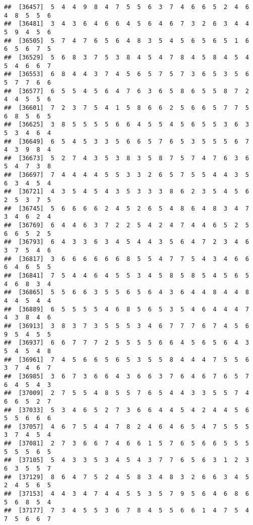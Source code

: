 \documentclass[
]{book}
\begin{document}
\begin{verbatim}
##  [36457]  5  4  4  9  8  4  7  5  5  6  3  7  4  6  6  5  2  4  6  4  8  5  5  6
##  [36481]  3  4  3  6  4  6  6  4  5  6  4  6  7  3  2  6  3  4  4  5  9  4  5  6
##  [36505]  5  7  4  7  6  5  6  4  8  3  5  4  5  6  5  6  5  1  6  6  5  6  7  5
##  [36529]  5  6  8  3  7  5  3  8  4  5  4  7  8  4  5  8  4  5  4  5  4  6  6  7
##  [36553]  6  8  4  4  3  7  4  5  6  5  7  5  7  3  6  5  3  5  6  5  7  7  6  6
##  [36577]  6  5  5  4  5  6  4  7  6  3  6  5  8  6  5  5  8  7  2  4  4  5  5  6
##  [36601]  7  2  3  7  5  4  1  5  8  6  6  2  5  6  6  5  7  7  5  6  8  5  6  5
##  [36625]  3  8  5  5  5  5  6  6  4  5  5  4  5  6  5  5  3  6  3  5  3  4  6  4
##  [36649]  6  5  4  5  3  3  5  6  6  5  7  6  5  3  5  5  5  6  7  4  3  9  8  4
##  [36673]  5  2  7  4  3  5  3  8  3  5  8  7  5  7  4  7  6  3  6  5  4  7  3  8
##  [36697]  7  4  4  4  4  5  5  3  3  2  6  5  7  5  5  4  4  3  5  6  3  4  5  4
##  [36721]  4  3  5  4  5  4  3  5  3  3  3  8  6  2  3  5  4  5  6  2  5  3  7  5
##  [36745]  5  6  6  6  6  2  4  5  2  6  5  4  8  6  4  8  3  4  7  3  4  6  2  4
##  [36769]  6  4  4  6  3  7  2  2  5  4  2  4  7  4  4  6  5  2  5  6  6  5  2  5
##  [36793]  6  4  3  3  6  3  4  5  4  4  3  5  6  4  7  2  3  4  6  3  7  5  4  6
##  [36817]  3  6  6  6  6  6  6  8  5  5  4  7  7  5  4  3  4  6  6  6  4  6  5  5
##  [36841]  7  5  4  4  6  4  5  5  3  4  5  8  5  8  5  4  5  6  5  4  6  8  3  4
##  [36865]  5  5  6  6  3  5  5  6  5  6  4  3  6  4  4  8  4  4  8  4  4  5  4  4
##  [36889]  6  5  5  5  5  4  6  8  5  6  5  3  5  4  6  4  4  4  7  4  3  8  4  6
##  [36913]  3  8  3  7  3  5  5  5  3  4  6  7  7  7  6  7  4  5  6  9  5  4  5  5
##  [36937]  6  6  7  7  7  2  5  5  5  5  6  6  4  5  6  5  6  4  3  5  4  5  4  8
##  [36961]  7  4  5  6  6  5  6  5  3  5  5  8  4  4  4  7  5  5  6  3  7  4  6  7
##  [36985]  3  6  7  3  6  6  4  3  6  6  3  7  6  4  6  7  6  5  7  6  4  5  4  3
##  [37009]  2  7  5  5  4  8  5  5  7  6  5  4  4  3  3  5  5  7  4  6  6  5  2  7
##  [37033]  5  3  4  6  5  2  7  3  6  6  4  4  5  4  2  4  4  5  6  5  5  6  6  6
##  [37057]  4  6  7  5  4  4  7  8  2  4  6  4  6  5  4  7  5  5  5  3  7  4  5  4
##  [37081]  2  7  3  6  6  7  4  6  6  1  5  7  6  5  6  6  5  5  5  5  5  5  6  5
##  [37105]  5  4  3  3  5  3  4  5  4  3  7  7  6  5  6  3  1  2  3  6  3  5  5  7
##  [37129]  8  6  4  7  5  2  4  5  8  3  4  8  3  2  6  6  3  4  5  2  4  5  6  5
##  [37153]  4  4  3  4  7  4  4  5  5  3  5  7  9  5  6  4  6  8  6  5  6  8  5  4
##  [37177]  7  3  4  5  5  3  6  7  8  4  5  5  6  6  1  4  7  5  4  7  5  6  6  7

\end{verbatim}
\end{document}

